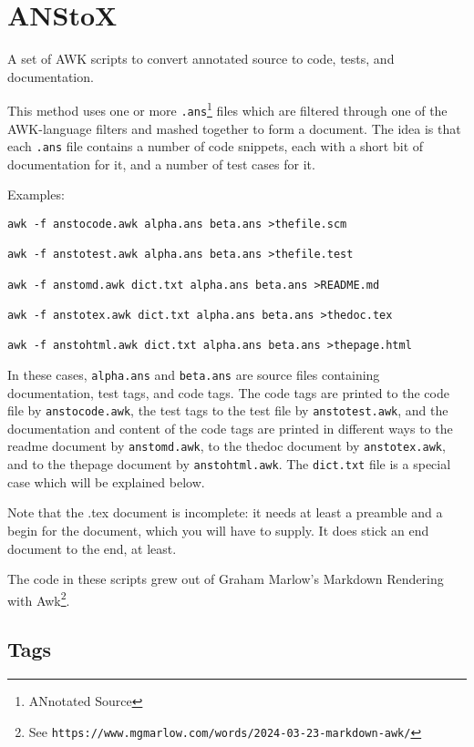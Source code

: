 \part{ANStoX}
\label{anstox}

A set of AWK scripts to convert annotated source to code, tests, and documentation.


This method uses one or more \texttt{.ans}\footnote{ANnotated Source} files which are filtered through one of the AWK-language filters and mashed together to form a document. The idea is that each \texttt{.ans} file contains a number of code snippets, each with a short bit of documentation for it, and a number of test cases for it.


Examples:

\begin{verbatim}
awk -f anstocode.awk alpha.ans beta.ans >thefile.scm

awk -f anstotest.awk alpha.ans beta.ans >thefile.test

awk -f anstomd.awk dict.txt alpha.ans beta.ans >README.md

awk -f anstotex.awk dict.txt alpha.ans beta.ans >thedoc.tex

awk -f anstohtml.awk dict.txt alpha.ans beta.ans >thepage.html
\end{verbatim}

In these cases, \texttt{alpha.ans} and \texttt{beta.ans} are source files containing documentation, test tags, and code tags. The code tags are printed to the code file by \texttt{anstocode.awk}, the test tags to the test file by \texttt{anstotest.awk}, and the documentation and content of the code tags are printed in different ways to the readme document by \texttt{anstomd.awk}, to the thedoc document by \texttt{anstotex.awk}, and to the thepage document by \texttt{anstohtml.awk}. The \texttt{dict.txt} file is a special case which will be explained below.


Note that the .tex document is incomplete: it needs at least a preamble and a begin for the document, which you will have to supply. It does stick an end document to the end, at least.


The code in these scripts grew out of Graham Marlow's Markdown Rendering with Awk\footnote{See \texttt{https://www.mgmarlow.com/words/2024-03-23-markdown-awk/}}.

\chapter{Tags}
\label{tags}
